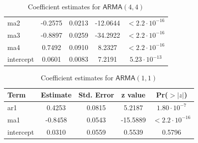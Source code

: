 \documentclass[12pt]{article}
\newcommand{\ARMA}{\textsf{ARMA}}
\begin{document}
\begin{enumerate}
\begin{table}[ht]
\begin{tabular}{l|cccc}
                ma2                            & -0.2575 & 0.0213 & -12.0644 & $< 2.2 \cdot 10^{-16}$ \\
                ma3                            & -0.8897 & 0.0259 & -34.2922 & $< 2.2 \cdot 10^{-16}$ \\
                ma4                            & 0.7492  & 0.0910 & 8.2327   & $< 2.2 \cdot 10^{-16}$ \\
                intercept                      & 0.0601  & 0.0083 & 7.2191   & $5.23 \cdot 10^{-13}$ \\
            \end{tabular}
            \caption{Coefficient estimates for $\ARMA(4, 4)$}
            \label{tab:arma44_coeffs}
        \end{table}
        \begin{table}[ht]
            \centering
            \begin{tabular}{l|cccc}
                \textbf{Term} & \textbf{Estimate} & \textbf{Std. Error} & \textbf{z value} & \textbf{Pr($>|z|$)} \\
                \hline
                ar1                          & 0.4253  & 0.0815 & 5.2187   & $1.80 \cdot 10^{-7}$ \\
                ma1                          & -0.8458 & 0.0543 & -15.5889 & $< 2.2 \cdot 10^{-16}$ \\
                \rowcolor{red!15} intercept  & 0.0310  & 0.0559 & 0.5539   & 0.5796 \\
            \end{tabular}
            \caption{Coefficient estimates for $\ARMA(1, 1)$}
            \label{tab:arma11_coeffs}
        \end{table}


\end{enumerate}
\end{document}
